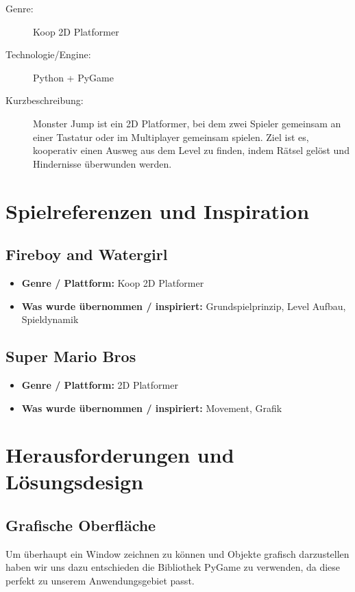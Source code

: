 \documentclass[12pt, a4paper, twoside]{article}
\begin{document}
\begin{description}
  \item[Genre:] Koop 2D Platformer
  \item[Technologie/Engine:] Python + PyGame
  \item[Kurzbeschreibung:] Monster Jump ist ein 2D Platformer, 
  bei dem zwei Spieler gemeinsam an einer Tastatur oder im Multiplayer gemeinsam spielen.
  Ziel ist es, kooperativ einen Ausweg aus dem Level zu finden, indem Rätsel gelöst und
  Hindernisse überwunden werden.
\end{description}

\section{Spielreferenzen und Inspiration}


\subsection{Fireboy and Watergirl}
\begin{itemize}
  \item \textbf{Genre / Plattform:} Koop 2D Platformer
  \item \textbf{Was wurde übernommen / inspiriert:} \newline Grundspielprinzip, Level Aufbau, Spieldynamik
\end{itemize}

\subsection{Super Mario Bros}
\begin{itemize}
  \item \textbf{Genre / Plattform:} 2D Platformer
  \item \textbf{Was wurde übernommen / inspiriert:} \newline Movement, Grafik
\end{itemize}


\newpage
\section{Herausforderungen und Lösungsdesign}

\subsection{Grafische Oberfläche}
Um überhaupt ein Window zeichnen zu können und Objekte grafisch darzustellen 
haben wir uns dazu entschieden die Bibliothek PyGame zu verwenden, da diese 
perfekt zu unserem Anwendungsgebiet passt.
\end{document}
